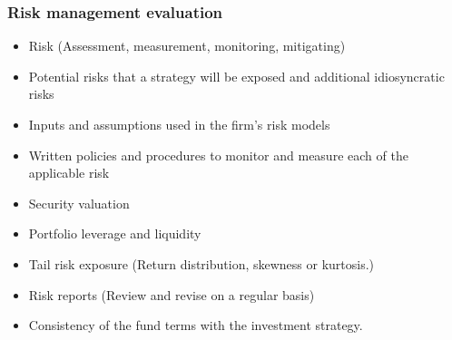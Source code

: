 \subsubsection{Risk management evaluation}
\begin{itemize}
\item Risk (Assessment, measurement, monitoring, mitigating)
\item Potential risks that a strategy will be exposed and additional idiosyncratic risks
\item Inputs and assumptions used in the firm's risk models
\item Written policies and procedures to monitor and measure each of the applicable risk
\item Security valuation
\item Portfolio leverage and liquidity
\item Tail risk exposure (Return distribution, skewness or kurtosis.)
\item Risk reports (Review and revise on a regular basis)
\item Consistency of the fund terms with the investment strategy.
\end{itemize}



